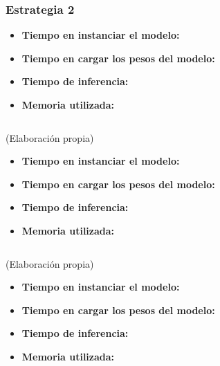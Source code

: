 \subsubsection{Estrategia 2}
\label{subsubsec:resultados:estrategia_2}

\begin{itemize}
    \item \textbf{Tiempo en instanciar el modelo:}
    \item \textbf{Tiempo en cargar los pesos del modelo:}
    \item \textbf{Tiempo de inferencia:}
    \item \textbf{Memoria utilizada:}
\end{itemize}

\begin{mycode}
    \begin{verbatim}

    \end{verbatim}
    \caption[]{ (Elaboración propia)}
    \label{code:}
\end{mycode}

\begin{itemize}
    \item \textbf{Tiempo en instanciar el modelo:}
    \item \textbf{Tiempo en cargar los pesos del modelo:}
    \item \textbf{Tiempo de inferencia:}
    \item \textbf{Memoria utilizada:}
\end{itemize}

\begin{mycode}
    \begin{verbatim}

    \end{verbatim}
    \caption[]{ (Elaboración propia)}
    \label{code:}
\end{mycode}






\begin{itemize}
    \item \textbf{Tiempo en instanciar el modelo:}
    \item \textbf{Tiempo en cargar los pesos del modelo:}
    \item \textbf{Tiempo de inferencia:}
    \item \textbf{Memoria utilizada:}
\end{itemize}

